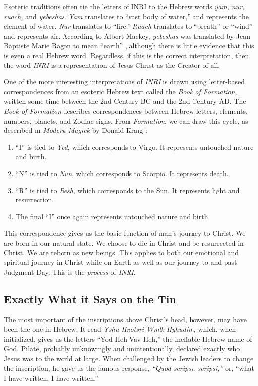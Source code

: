 \documentclass[letterpaper,11pt]{article}
\begin{document}
	Esoteric traditions often tie the letters of INRI to the Hebrew words \emph{yam,} \emph{nur,} \emph{ruach,} and \emph{yebeshas.} \cite{mackey} \emph{Yam} translates to ``vast body of water,'' and represents the element of water. \emph{Nur} translates to ``fire.'' \emph{Ruach} translates to ``breath'' or ``wind'' and represents air. According to Albert Mackey, \emph{yebeshas} was translated by Jean Baptiste Marie Ragon to mean ``earth'' \cite{mackey}, although there is little evidence that this is even a real Hebrew word. Regardless, if this is the correct interpretation, then the word \emph{INRI} is a representation of Jesus Christ as the Creator of all. 
	
	One of the more interesting interpretations of \emph{INRI} is drawn using letter-based correspondences from an 
	esoteric Hebrew text called the \emph{Book of Formation}, written some time between the 2nd Century BC and the 2nd Century AD. The \emph{Book of Formation} describes correspondences between Hebrew letters, elements, numbers, planets, and Zodiac signs. From \emph{Formation}, we can draw this cycle, as described in \emph{Modern Magick} by Donald Kraig \cite{kraig}:
	
	\begin{enumerate}
		\item ``I'' is tied to \emph{Yod}, which corresponds to Virgo. It represents untouched nature and birth.
		\item ``N'' is tied to \emph{Nun}, which corresponds to Scorpio. It represents death.
		\item ``R'' is tied to \emph{Resh}, which corresponds to the Sun. It represents light and resurrection.
		\item The final ``I'' once again represents untouched nature and birth.
	\end{enumerate}	

	This correspondence gives us the basic function of man’s journey to Christ. We are born in our natural state. We choose to die in Christ and be resurrected in Christ. We are reborn as new beings. This applies to both our emotional and spiritual journey in Christ while on Earth as well as our journey to and past Judgment Day. This is the \emph{process} of \emph{INRI}.
			
	\subsection*{Exactly What it Says on the Tin}
				
	The most important of the inscriptions above Christ’s head, however, may have been the one in Hebrew. It read \emph{Yshu Hnotsri Wmlk Hyhudim,} which, when initialized, gives us the letters ``Yod-Heh-Vav-Heh,'' the ineffable Hebrew name of God. Pilate, probably unknowingly and unintentionally, declared exactly who Jesus was to the world at large. When challenged by the Jewish leaders to change the inscription, he gave us the famous response, \emph{``Quod scripsi, scripsi,''} or, ``what I have written, I have written.''

	\vspace*{\fill}

	\pagebreak
	
	\printbibliography
	
\end{document}
